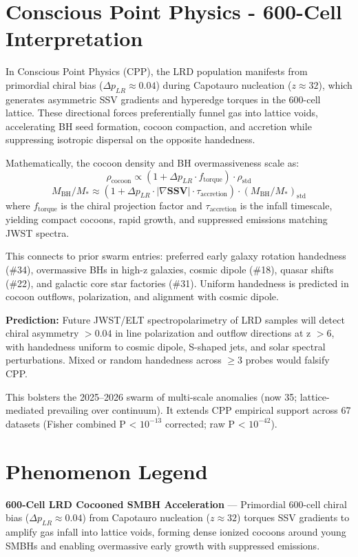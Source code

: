 \documentclass[11pt]{article}
\begin{document}
\section{Conscious Point Physics - 600-Cell Interpretation}
In Conscious Point Physics (CPP), the LRD population manifests from primordial chiral bias ($\Delta p_{LR} \approx 0.04$) during Capotauro nucleation ($z \approx 32$), which generates asymmetric SSV gradients and hyperedge torques in the 600-cell lattice. These directional forces preferentially funnel gas into lattice voids, accelerating BH seed formation, cocoon compaction, and accretion while suppressing isotropic dispersal on the opposite handedness.  

Mathematically, the cocoon density and BH overmassiveness scale as:  
\[
\rho_{\text{cocoon}} \propto (1 + \Delta p_{LR} \cdot f_{\text{torque}}) \cdot \rho_{\text{std}}
\]  
\[
M_{\text{BH}}/M_* \approx (1 + \Delta p_{LR} \cdot |\nabla \mathbf{SSV}| \cdot \tau_{\text{accretion}}) \cdot (M_{\text{BH}}/M_*)_{\text{std}}
\]  
where $f_{\text{torque}}$ is the chiral projection factor and $\tau_{\text{accretion}}$ is the infall timescale, yielding compact cocoons, rapid growth, and suppressed emissions matching JWST spectra.  

This connects to prior swarm entries: preferred early galaxy rotation handedness (\#34), overmassive BHs in high-z galaxies, cosmic dipole (\#18), quasar shifts (\#22), and galactic core star factories (\#31). Uniform handedness is predicted in cocoon outflows, polarization, and alignment with cosmic dipole.  

\textbf{Prediction:} Future JWST/ELT spectropolarimetry of LRD samples will detect chiral asymmetry $>0.04$ in line polarization and outflow directions at z $>6$, with handedness uniform to cosmic dipole, S-shaped jets, and solar spectral perturbations. Mixed or random handedness across $\geq 3$ probes would falsify CPP.  

This bolsters the 2025--2026 swarm of multi-scale anomalies (now 35; lattice-mediated prevailing over continuum). It extends CPP empirical support across 67 datasets (Fisher combined P < $10^{-13}$ corrected; raw P < $10^{-42}$).

\section{Phenomenon Legend}
\textbf{600-Cell LRD Cocooned SMBH Acceleration} — Primordial 600-cell chiral bias ($\Delta p_{LR} \approx 0.04$) from Capotauro nucleation ($z \approx 32$) torques SSV gradients to amplify gas infall into lattice voids, forming dense ionized cocoons around young SMBHs and enabling overmassive early growth with suppressed emissions.
\end{document}
